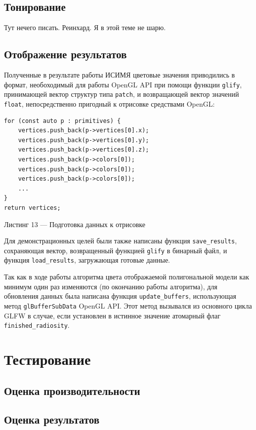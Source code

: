 \documentclass[12pt]{article}
\begin{document}
\subsection{Тонирование}
Тут нечего писать. Реинхард. Я в этой теме не шарю.
\subsection{Отображение результатов}
Полученные в результате работы ИСИМЯ цветовые значения приводились в формат, необоходимый для работы OpenGL API при помощи функции \texttt{glify}, принимающей вектор структур типа \texttt{patch}, и возвращающей вектор значений \texttt{float}, непосредственно пригодный к отрисовке средствами OpenGL:
\begin{lstlisting}
for (const auto p : primitives) {
    vertices.push_back(p->vertices[0].x);
    vertices.push_back(p->vertices[0].y);
    vertices.push_back(p->vertices[0].z);
    vertices.push_back(p->colors[0]);
    vertices.push_back(p->colors[0]);
    vertices.push_back(p->colors[0]);
    ...
}
return vertices;
\end{lstlisting}
\begin{center}Листинг 13 --- Подготовка данных к отрисовке \end{center}

Для демонстрационных целей были также написаны функция \texttt{save\_results}, сохраняющая вектор, возвращенный функцией \texttt{glify} в бинарный файл, и функция \texttt{load\_results}, загружающая готовые данные.

Так как в ходе работы алгоритма цвета отображаемой полигональной модели как минимум один раз изменяются (по окончанию работы алгоритма), для обновления данных была написана функция \texttt{update\_buffers}, использующая метод \texttt{glBufferSubData} OpenGL API. Этот метод вызывался из основного цикла GLFW в случае, если установлен в истинное значение атомарный флаг \texttt{finished\_radiosity}.
\newpage\section{Тестирование}
\subsection{Оценка производительности}
\subsection{Оценка результатов}
\end{document}
